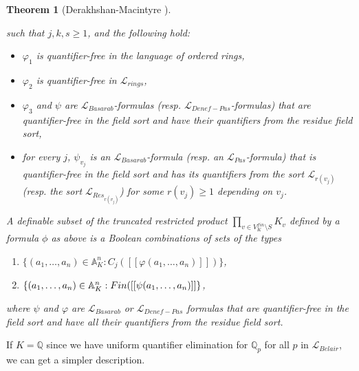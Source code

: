 \documentclass[12pt]{amsart}
\def\A{\mathbb{A}}
\def\cL{\mathcal{L}}
\def\Q{\mathbb{Q}}
\def\cL{\mathcal{L}}
\newtheorem{thm}{Theorem}[section]
\numberwithin{equation}{section}
\begin{document}
\begin{thm}[Derakhshan-Macintyre {\cite{DM-ad}}]
\begin{itemize}
\end{itemize}
such that  $j,k,s\geq 1$, and the following hold:
\begin{itemize}
\item $\varphi_1$ is quantifier-free in the language of ordered rings, 
\item $\varphi_2$ is quantifier-free in $\cL_{rings}$, 
\item $\varphi_3$ and $\psi$ are $\cL_{Basarab}$-formulas (resp. $\cL_{Denef-Pas}$-formulas) that are quantifier-free in the field sort and have their quantifiers from the residue field sort,   
\item for every $j$, $\psi_{v_j}$ is an $\cL_{Basarab}$-formula (resp. an $\cL_{Pas}$-formula) that is quantifier-free in the field sort and 
has its quantifiers from the sort $\cL_{r(v_j)}$ (resp. the sort $\cL_{Res_{r(v_j)}}$) for some $r(v_j)\geq 1$ depending on $v_j$.
\end{itemize}
A definable subset of the truncated restricted product $\prod_{v\in V_K^{fin}\setminus S} K_v$ defined by a formula $\phi$ as above 
is a Boolean combinations of sets of the types
\begin{enumerate}
\item $\{(a_1,\dots,a_n)\in \A_K^n: C_j([[\varphi(a_1,\dots,a_n)]])\}$,
\item $\{(a_1,\dots,a_n)\in \Bbb A_K^n: Fin([[\psi(a_1,\dots,a_n)]]\}$,
\end{enumerate}
where $\psi$ and $\varphi$ are $\cL_{Basarab}$ or $\cL_{Denef-Pas}$ formulas that are quantifier-free in the field sort and 
have all their quantifiers from the residue field sort.
\end{thm}

If $K=\Q$ since we have uniform quantifier elimination for $\Q_p$ for all
$p$ in $\cL_{Belair}$, we can get a simpler description.
\end{document}
